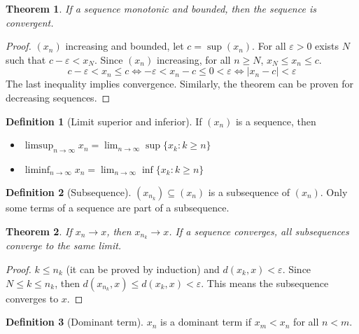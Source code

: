 \documentclass{article}
\newcommand{\abs}[1]{\left|#1\right|}
\newcommand{\limn}{\lim_{n \to \infty}}
\theoremstyle{definition}
\newtheorem{definition}{Definition}[section]
\theoremstyle{definition}
\theoremstyle{plain}
\newtheorem{theorem}{Theorem}[section]
\theoremstyle{plain}
\theoremstyle{plain}
\theoremstyle{plain}
\theoremstyle{definition}
\theoremstyle{remark}
\theoremstyle{remark}
\theoremstyle{remark}
\theoremstyle{remark}
\newcommand{\E}{\varepsilon}
\begin{document}
\begin{theorem}
  If a sequence monotonic and bounded, then the sequence is convergent.
\end{theorem}

\begin{proof}
  $(x_n)$ increasing and bounded, let $c = \sup(x_n)$. For all $\E > 0$ exists $N$ such that $c - \E < x_N$. Since $(x_n)$ increasing, for all $n \geq N$, $x_N \leq x_n \leq c$.
  \[
  c - \E < x_n \leq c \iff - \E < x_n - c \leq 0 < \E \iff
  \abs{x_n - c} < \E
  \]
  The last inequality implies convergence. Similarly, the theorem can be proven for decreasing sequences.
\end{proof}


\begin{definition}[Limit superior and inferior]
  If $(x_n)$ is a sequence, then
  \begin{itemize}
    \item $\limsup_{n \to \infty} x_n = \limn \sup\{x_k : k \geq n\}$
    \item $\liminf_{n \to \infty} x_n = \limn \inf\{x_k : k \geq n\}$
  \end{itemize}
\end{definition}



\begin{definition}[Subsequence]
  $(x_{n_k}) \subseteq (x_n)$ is a subsequence of $(x_n)$. Only some terms of a sequence are part of a subsequence.
\end{definition}



\begin{theorem}
  If $x_n \to x$, then $x_{n_k} \to x$. If a sequence converges, all subsequences converge to the same limit.
\end{theorem}

\begin{proof}
  $k \leq n_k$ (it can be proved by induction) and $d(x_k,x) < \E$. Since $N \leq k \leq n_k$, then $d(x_{n_k},x) \leq d(x_k,x) < \E$. This means the subsequence converges to $x$.
\end{proof}


\begin{definition}[Dominant term]
  $x_n$ is a dominant term if $x_m < x_n$ for all $n < m$.
\end{definition}
\end{document}

